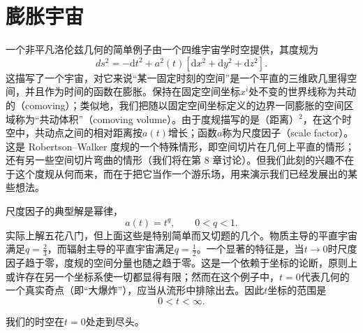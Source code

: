\section{膨胀宇宙}

一个非平凡洛伦兹几何的简单例子由一个四维宇宙学时空提供，其度规为
\begin{equation*}
ds^2=-\mathrm{d}t^2+a^2(t)\left[\mathrm{d}x^2+\mathrm{d}y^2+\mathrm{d}z^2\right].
\tag{2.53}
\end{equation*}
这描写了一个宇宙，对它来说“某一固定时刻的空间”是一个平直的三维欧几里得空间，并且作为时间的函数在膨胀。保持在固定空间坐标$x^i$处不变的世界线称为共动的（comoving）；类似地，我们把随以固定空间坐标定义的边界一同膨胀的空间区域称为“共动体积”（comoving volume）。由于度规描写的是（距离）$^2$，在这个时空中，共动点之间的相对距离按$a(t)$增长；函数$a$称为尺度因子（scale factor）。这是 Robertson–Walker 度规的一个特殊情形，即空间切片在几何上平直的情形；还有另一些空间切片弯曲的情形（我们将在第 8 章讨论）。但我们此刻的兴趣不在于这个度规从何而来，而在于把它当作一个游乐场，用来演示我们已经发展出的某些想法。

尺度因子的典型解是幂律，
\begin{equation*}
a(t)=t^q,\qquad 0<q<1.
\tag{2.54}
\end{equation*}
实际上解五花八门，但上面这些是特别简单而又切题的几个。物质主导的平直宇宙满足$q=\frac{2}{3}$，而辐射主导的平直宇宙满足$q=\frac{1}{2}$。一个显著的特征是，当$t\to0$时尺度因子趋于零，度规的空间分量也随之趋于零。这是一个依赖于坐标的论断，原则上或许存在另一个坐标系使一切都显得有限；然而在这个例子中，$t=0$代表几何的一个真实奇点（即“大爆炸”），应当从流形中排除出去。因此$t$坐标的范围是
\begin{equation*}
0<t<\infty.
\tag{2.55}
\end{equation*}

我们的时空在$t=0$处走到尽头。

